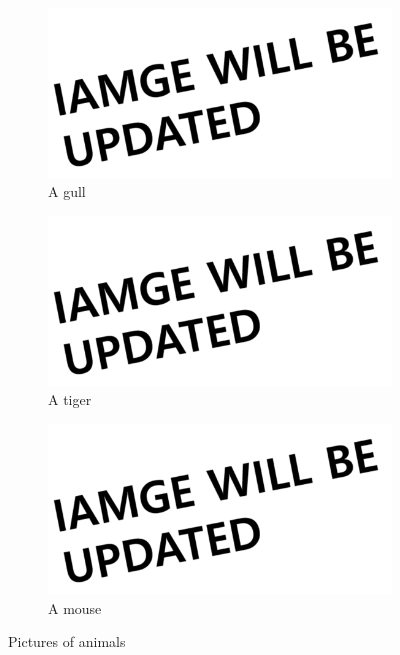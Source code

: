 \documentclass[letterpaper, 10 pt, conference]{ieeeconf}  %
\begin{document}
\begin{figure}[h]
	\centering
	\begin{subfigure}[b]{0.3\textwidth}
		\includegraphics[width=\textwidth]{image/be_updated}
		\caption{A gull}
		\label{fig:gull2342}
	\end{subfigure}
	\begin{subfigure}[b]{0.3\textwidth}
		\includegraphics[width=\textwidth]{image/be_updated}
		\caption{A tiger}
		\label{fig:tige234r2}
	\end{subfigure}
	\begin{subfigure}[b]{0.3\textwidth}
		\includegraphics[width=\textwidth]{image/be_updated}
		\caption{A mouse}
		\label{fig:mous234e2}
	\end{subfigure}
	\caption{Pictures of animals}\label{fig:a234nimals22}
\end{figure}
\end{document}
